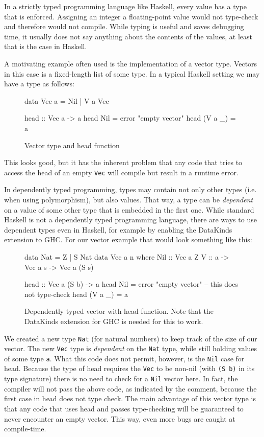 \documentclass[a4paper,12pt,notitlepage]{report}
\begin{document}
In a strictly typed programming language like Haskell, every value has a type
that is enforced. Assigning an integer a floating-point value would not
type-check and therefore would not compile. While typing is useful and saves
debugging time, it usually does not say anything about the contents of the
values, at least that is the case in Haskell.

A motivating example often used is the implementation of a vector type. Vectors
in this case is a fixed-length list of some type. In a typical Haskell setting
we may have a type as follows:

\begin{figure}[H]
\begin{code}
data Vec a = Nil | V a Vec

head :: Vec a -> a
head Nil = error "empty vector"
head (V a _) = a
\end{code}
\caption{Vector type and head function}
\end{figure}

This looks good, but it has the inherent problem that any code that tries to
access the head of an empty \texttt{Vec} will compile but result in a runtime error. 

In dependently typed programming, types may contain not only other types (i.e.
when using polymorphism), but also values. That way, a type can be
\textit{dependent} on a value of some other type that is embedded in the first
one. While standard Haskell is not a dependently typed programming language,
there are ways to use dependent types even in Haskell, for example by enabling
the DataKinds extension to GHC. For our vector example that would look something
like this:

\begin{figure}[H]
\begin{code}
data Nat = Z | S Nat
data Vec a n where
    Nil :: Vec a Z
    V :: a -> Vec a s -> Vec a (S s)

head :: Vec a (S b) -> a
head Nil = error "empty vector" -- this does not type-check
head (V a _) = a
\end{code}
\caption{Dependently typed vector with head function. Note that the DataKinds
extension for GHC is needed for this to work.}
\end{figure}

We created a new type \texttt{Nat} (for natural numbers) to keep track of the
size of our vector. The new \texttt{Vec} type is \textit{dependent} on the
\texttt{Nat} type, while still holding values of some type \texttt{a}. What this
code does not permit, however, is the \texttt{Nil} case for head. Because the
type of head requires the \texttt{Vec} to be non-nil (with \texttt{(S b)} in its
type signature) there is no need to check for a \texttt{Nil} vector here. In
fact, the compiler will not pass the above code, as indicated by the comment,
because the first case in head does not type check. The main advantage of this
vector type is that any code that uses head and passes type-checking will be
guaranteed to never encounter an empty vector.  This way, even more bugs are
caught at compile-time.
\end{document}
